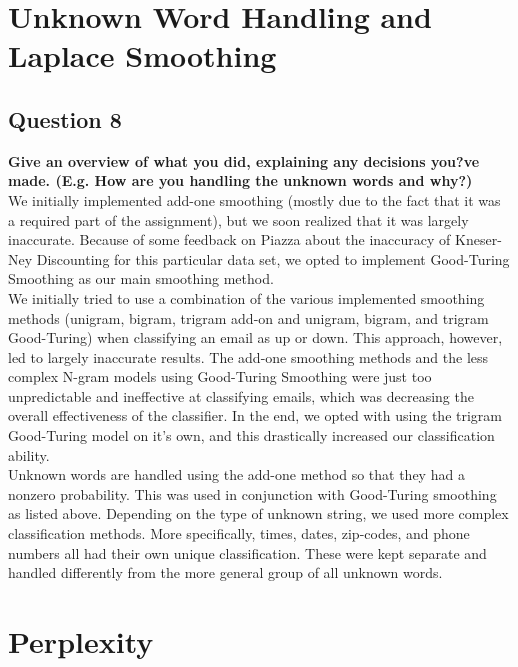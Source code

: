 \documentclass{article} %
\begin{document}
\lipsum[2] %

\section{Unknown Word Handling and Laplace Smoothing}

\subsection*{Question 8}

\textbf{Give an overview of what you did, explaining any decisions you?ve made. (E.g. How are you handling the unknown words and why?)}
\\

We initially implemented add-one smoothing (mostly due to the fact that it was a required part of the assignment), but we soon realized that it was largely inaccurate. Because of some feedback on Piazza about the inaccuracy of Kneser-Ney Discounting for this particular data set, we opted to implement Good-Turing Smoothing as our main smoothing method.\\

We initially tried to use a combination of the various implemented smoothing methods (unigram, bigram, trigram add-on and unigram, bigram, and trigram Good-Turing) when classifying an email as up or down. This approach, however, led to largely inaccurate results. The add-one smoothing methods and the less complex N-gram models using Good-Turing Smoothing were just too unpredictable and ineffective at classifying emails, which was decreasing the overall effectiveness of the classifier. In the end, we opted with using the trigram Good-Turing model on it's own, and this drastically increased our classification ability.\\

Unknown words are handled using the add-one method so that they had a nonzero probability. This was used in conjunction with Good-Turing smoothing as listed above. Depending on the type of unknown string, we used more complex classification methods. More specifically, times, dates, zip-codes, and phone numbers all had their own unique classification. These were kept separate and handled differently from the more general group of all unknown words.


\lipsum[2] %

\section{Perplexity}
\end{document}

